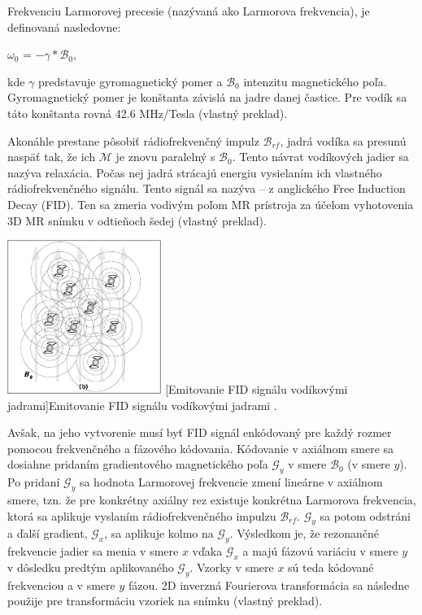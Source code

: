 \clearpage

Frekvenciu Larmorovej precesie (nazývaná ako Larmorova frekvencia), je definovaná nasledovne:

\begin {center}
$\omega_{0}$ = $-\gamma * \mathcal{B}_{0}$,
\end {center}

kde $\gamma$ predstavuje gyromagnetický pomer a $\mathcal{B}_{0}$ intenzitu magnetického poľa.
Gyromagnetický pomer je konštanta závislá na jadre danej častice. Pre vodík sa táto konštanta rovná 42.6 MHz/Tesla \cite{basic_principles_of_mri} (vlastný preklad).

Akonáhle prestane pôsobiť rádiofrekvenčný impulz $\mathcal{B}_{rf}$, jadrá vodíka sa presunú naspäť tak, že ich $\mathcal{M}$ je znovu paralelný s $\mathcal{B}_{0}$. Tento návrat vodíkových jadier sa nazýva relaxácia. Počas nej jadrá strácajú energiu vysielaním ich vlastného rádiofrekvenčného signálu. Tento signál sa nazýva  -- z anglického Free Induction Decay (FID). Ten sa zmeria vodivým poľom MR prístroja za účelom vyhotovenia 3D MR snímku v odtieňoch šedej \cite{basic_principles_of_mri} (vlastný preklad).

\begin {center}
        \centering
        \includegraphics[height=5cm]{media/hydrogen/hydrogen_emitting_rf.png}
        \captionsetup{justification=centering}
        [Emitovanie FID signálu vodíkovými jadrami]{Emitovanie FID signálu vodíkovými jadrami \cite{basic_principles_of_mri}.}
\end {center}

Avšak, na jeho vytvorenie musí byť FID signál enkódovaný pre každý rozmer pomocou frekvenčného a fázového kódovania. Kódovanie v axiálnom smere sa dosiahne pridaním gradientového magnetického poľa $\mathcal{G}_{y}$ v smere $\mathcal{B}_{0}$ (v smere $y$). Po pridaní $\mathcal{G}_{y}$ sa hodnota Larmorovej frekvencie zmení lineárne v axiálnom smere, tzn. že pre konkrétny axiálny rez existuje konkrétna Larmorova frekvencia, ktorá sa aplikuje vyslaním rádiofrekvenčného impulzu $\mathcal{B}_{rf}$. $\mathcal{G}_{y}$ sa potom odstráni a ďalší gradient, $\mathcal{G}_{x}$, sa aplikuje kolmo na $\mathcal{G}_{y}$. Výsledkom je, že rezonančné frekvencie jadier sa menia v smere $x$ vďaka $\mathcal{G}_{x}$ a majú fázovú variáciu v smere $y$ v dôsledku predtým aplikovaného $\mathcal{G}_{y}$. Vzorky v smere $x$ sú teda kódované frekvenciou a v smere $y$ fázou. 2D inverzná Fourierova transformácia sa následne použije pre transformáciu vzoriek na snímku \cite{basic_principles_of_mri} (vlastný preklad).

